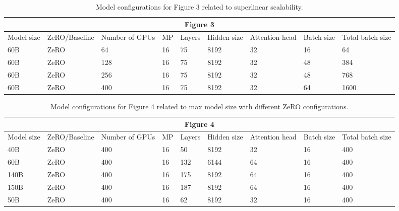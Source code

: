 \begin{table}[t!]
\scriptsize
\begin{tabular}{|l|l|l|l|l|l|l|l|l|}
\hline
\multicolumn{9}{|c|}{Figure 3} \\ \hline
Model size & ZeRO/Baseline & Number of GPUs & MP & Layers & Hidden size & Attention head & Batch size & Total batch size \\ \hline
60B & ZeRO & 64 & 16 & 75 & 8192 & 32 & 16 & 64 \\ \hline
60B & ZeRO & 128 & 16 & 75 & 8192 & 32 & 48 & 384 \\ \hline
60B & ZeRO & 256 & 16 & 75 & 8192 & 32 & 48 & 768 \\ \hline
60B & ZeRO & 400 & 16 & 75 & 8192 & 32 & 64 & 1600 \\ \hline
\end{tabular}
\caption{Model configurations for Figure 3 related to superlinear scalability.} \label{tab:fig3-tab}
\end{table}

\begin{table}[t!]
\scriptsize
\begin{tabular}{|l|l|l|l|l|l|l|l|l|}
\hline
\multicolumn{9}{|c|}{Figure 4} \\ \hline
Model size & ZeRO/Baseline & Number of GPUs & MP & Layers & Hidden size & Attention head & Batch size & Total batch size \\ \hline
40B & ZeRO & 400 & 16 & 50 & 8192 & 32 & 16 & 400 \\ \hline
60B & ZeRO & 400 & 16 & 132 & 6144 & 64 & 16 & 400 \\ \hline
140B & ZeRO & 400 & 16 & 175 & 8192 & 64 & 16 & 400 \\ \hline
150B & ZeRO & 400 & 16 & 187 & 8192 & 64 & 16 & 400 \\ \hline
50B & ZeRO & 400 & 16 & 62 & 8192 & 32 & 16 & 400 \\ \hline
\end{tabular}
\caption{Model configurations for Figure 4 related to max model size with different ZeRO configurations.} \label{tab:fig4-tab}
\end{table}

